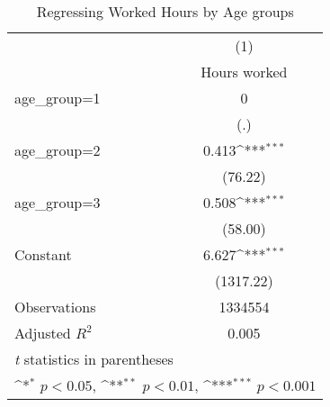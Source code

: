 \begin{table}[htbp]\centering
\def\sym#1{\ifmmode^{#1}\else\(^{#1}\)\fi}
\caption{Regressing Worked Hours by Age groups}
\begin{tabular}{l*{1}{c}}
\hline\hline
                    &\multicolumn{1}{c}{(1)}\\
                    &\multicolumn{1}{c}{Hours worked}\\
\hline
age\_group=1         &           0         \\
                    &         (.)         \\
[1em]
age\_group=2         &       0.413\sym{***}\\
                    &     (76.22)         \\
[1em]
age\_group=3         &       0.508\sym{***}\\
                    &     (58.00)         \\
[1em]
Constant            &       6.627\sym{***}\\
                    &   (1317.22)         \\
\hline
Observations        &     1334554         \\
Adjusted \(R^{2}\)  &       0.005         \\
\hline\hline
\multicolumn{2}{l}{\footnotesize \textit{t} statistics in parentheses}\\
\multicolumn{2}{l}{\footnotesize \sym{*} \(p<0.05\), \sym{**} \(p<0.01\), \sym{***} \(p<0.001\)}\\
\end{tabular}
\end{table}
